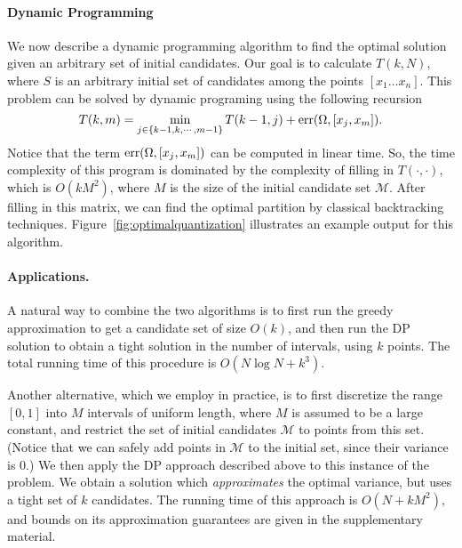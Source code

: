 \paragraph*{Dynamic Programming}

We now describe
a dynamic programming algorithm to 
find the optimal solution given an arbitrary set of initial candidates. 
Our goal is to calculate $T(k, N)$, where $S$ is an arbitrary initial set of candidates among the points $[x_1 \ldots x_n]$. 
This problem can be solved by dynamic programing using the following recursion
\[
T(k, m) = \min_{j\in \{k-1, k, \cdots, m-1\}} T(k-1,j) + \mathrm{err} (\Omega, [x_j, x_m]).
\]
Notice that the term $\mathrm{err} (\Omega, [x_j, x_m])$ can be computed in linear time. So, the time complexity of this program is dominated by the complexity of filling in $T(\cdot, \cdot)$, which is $O(k M^2)$, where $M$ is the size of the initial candidate set $\mathcal{M}$. 
After filling in this matrix, we can find the optimal partition by classical backtracking techniques.
Figure~\ref{fig:optimalquantization} illustrates
an example output for this algorithm. 

\paragraph{Applications.} 
A natural way to combine the two algorithms is to first run the greedy approximation to get a candidate set of size $O(k)$, and then run the DP solution to obtain a tight solution in the number of intervals, using $k$ points. 
The total running time of this procedure is $O( N \log N + k^3 )$. 

Another alternative, which we employ in practice, is to first discretize the range $[0, 1]$ into $M$ intervals of uniform length, where $M$ is assumed to be a large constant, and restrict the set of initial candidates $\mathcal{M}$ to points from this set. (Notice that we can safely add points in $\mathcal{M}$ to the initial set, since their variance is $0$.) We then apply the DP approach described above to this instance of the problem. 
We obtain a solution which \emph{approximates} the optimal variance, but uses a tight set of $k$ candidates. The running time of this approach is $O( N + k M^2 )$, and bounds on its approximation guarantees are given in the supplementary material.  

\fi





